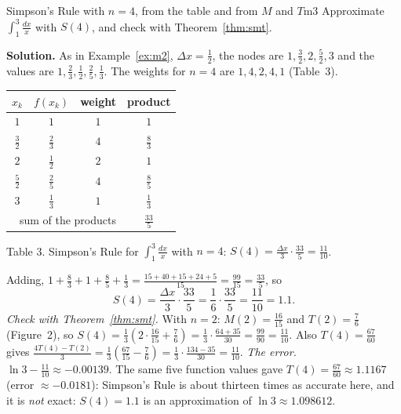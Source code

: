 \documentclass[11pt]{article}
\begin{document}
\begin{exmp}{Simpson's Rule with $n=4$, from the table and from $M$ and $T$}{m3}
Approximate $\displaystyle\int_1^3\frac{dx}x$ with $S(4)$, and check with Theorem~\ref{thm:smt}.

\textbf{Solution.} As in Example~\ref{ex:m2}, $\Delta x=\frac12$, the nodes are $1,\frac32,2,\frac52,3$ and the values are $1,\frac23,\frac12,\frac25,\frac13$. The weights for $n=4$ are $1,4,2,4,1$ (Table~3).
\begin{center}
\begin{tabular}{cccc}
\toprule $x_k$ & $f(x_k)$ & weight & product\\\midrule
$1$ & $1$ & $1$ & $1$\\
$\frac32$ & $\frac23$ & $4$ & $\frac83$\\
$2$ & $\frac12$ & $2$ & $1$\\
$\frac52$ & $\frac25$ & $4$ & $\frac85$\\
$3$ & $\frac13$ & $1$ & $\frac13$\\\midrule
\multicolumn{3}{r}{sum of the products} & $\frac{33}{5}$\\\bottomrule
\end{tabular}
\end{center}
\begin{center}\small Table 3. Simpson's Rule for $\int_1^3\frac{dx}x$ with $n=4$: $S(4)=\frac{\Delta x}3\cdot\frac{33}5=\frac{11}{10}$.\end{center}
Adding, $1+\frac83+1+\frac85+\frac13=\frac{15+40+15+24+5}{15}=\frac{99}{15}=\frac{33}5$, so
\[S(4)=\frac{\Delta x}3\cdot\frac{33}5=\frac16\cdot\frac{33}5=\frac{11}{10}=1.1 .\]
\emph{Check with Theorem~\ref{thm:smt}.} With $n=2$: $M(2)=\frac{16}{15}$ and $T(2)=\frac76$ (Figure~2), so $S(4)=\frac13\left(2\cdot\frac{16}{15}+\frac76\right)=\frac13\cdot\frac{64+35}{30}=\frac{99}{90}=\frac{11}{10}$. Also $T(4)=\frac{67}{60}$ gives $\frac{4T(4)-T(2)}3=\frac13\left(\frac{67}{15}-\frac76\right)=\frac13\cdot\frac{134-35}{30}=\frac{11}{10}$.
\emph{The error.} $\ln3-\frac{11}{10}\approx-0.00139$. The same five function values gave $T(4)=\frac{67}{60}\approx1.1167$ (error $\approx-0.0181$): Simpson's Rule is about thirteen times as accurate here, and it is \emph{not} exact: $S(4)=1.1$ is an approximation of $\ln3\approx1.098612$.
\end{exmp}
\end{document}
